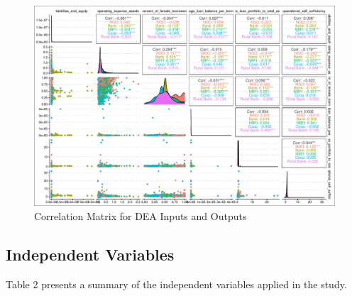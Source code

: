 \documentclass[
]{article}
\begin{document}
\begin{landscape}

\newpage

\begin{figure}
\centering
\includegraphics{finsoc_efficiency_files/figure-latex/unnamed-chunk-18-1.pdf}
\caption{Correlation Matrix for DEA Inputs and Outputs}
\end{figure}

\end{landscape}

\newpage

\hypertarget{independent-variables}{%
\subsection{Independent Variables}\label{independent-variables}}

Table 2 presents a summary of the independent variables applied in the
study.
\end{document}
